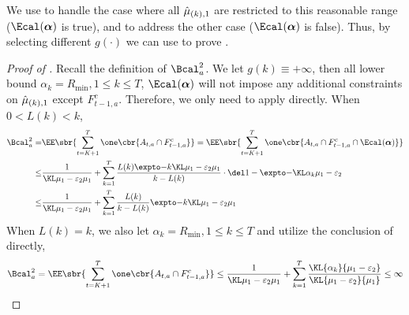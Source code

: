     
    We use  to handle the case where all ${\hat\mu}_{(k), 1}$ are restricted to this reasonable range ($\Ecal(\boldsymbol{\alpha})$ is true), and  to address the other case ($\Ecal(\boldsymbol{\alpha})$ is false). 
    Thus, by selecting different $g(\cdot)$ we can use  to prove .
    
    \begin{proof}[Proof of ]
        Recall the definition of $\Bcal^2_{a}$. We let $g(k) \equiv +\infty $, then all lower bound $\alpha_k = R_{\min}, 1 \leq k \leq T$, $\Ecal(\boldsymbol{\alpha})$ will not impose any additional constraints on ${\hat\mu}_{(k),1}$ except $F^c_{t-1,a}$. Therefore, we only need to apply  directly.
        When $0 < L(k) < k$,
        \begin{align*}
            \Bcal^2_{a}
            =& 
            \EE \sbr{ 
            \sum_{t=K+1}^T
            \one\cbr{ A_{t,a} \cap F_{t-1,a}^c }
            }
            =
            \EE \sbr{ 
            \sum_{t=K+1}^T
            \one\cbr{ A_{t,a} \cap F_{t-1,a}^c \cap \Ecal(\boldsymbol{\alpha}) }
            }
            \\
            \leq&
            \ExpFThreeOne
            \\
            \leq&
            \ExpFThreeAO
        \end{align*}
        When $L(k) = k$, we also let $\alpha_k = R_{\min}, 1 \leq k \leq T$ and utilize the conclusion of  directly,
        \[
            \Bcal^2_{a}
            =
            \EE \sbr{ 
            \sum_{t=K+1}^T
            \one\cbr{ A_{t,a} \cap F_{t-1,a}^c }
            }
            \leq
            \ExpFThreeOneA +
            \sum_{k=1}^{T}
            \frac{\KL{\alpha_k}{\mu_1 - \varepsilon_2}}{\KL{\mu_1 - \varepsilon_2}{\mu_1}}
            \leq
            \infty
        \]
    \end{proof}
    
